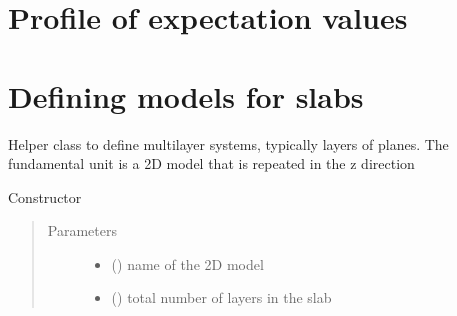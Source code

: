 \documentclass[letterpaper,10pt,english]{sphinxmanual}
\begin{document}
\section{Profile of expectation values}
\label{\detokenize{utilities:profile-of-expectation-values}}

\section{Defining models for slabs}
\label{\detokenize{utilities:defining-models-for-slabs}}

\begin{fulllineitems}
\label{\detokenize{utilities:pyqcm.slab.slab}}
\sphinxAtStartPar
Helper class to define multi\sphinxhyphen{}layer systems, typically layers of planes.
The fundamental unit is a 2D model that is repeated in the z direction

\begin{fulllineitems}
\label{\detokenize{utilities:pyqcm.slab.slab.__init__}}
\sphinxAtStartPar
Constructor
\begin{quote}\begin{description}
\item[{Parameters}] \leavevmode\begin{itemize}
\item {} 
\sphinxAtStartPar
{} () \textendash{} name of the 2D model

\item {} 
\sphinxAtStartPar
{} () \textendash{} total number of layers in the slab


\end{itemize}
\end{description}
\end{quote}
\end{fulllineitems}
\end{fulllineitems}
\end{document}
